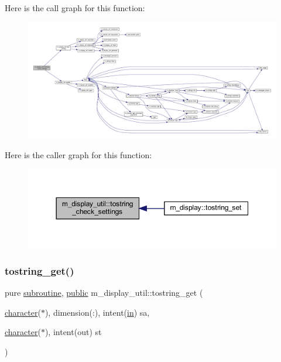 Here is the call graph for this function\+:
\nopagebreak
\begin{figure}[H]
\begin{center}
\leavevmode
\includegraphics[width=350pt]{namespacem__display__util_a76361afb9f9c3952c258f1f8053ec62a_cgraph}
\end{center}
\end{figure}
Here is the caller graph for this function\+:
\nopagebreak
\begin{figure}[H]
\begin{center}
\leavevmode
\includegraphics[width=350pt]{namespacem__display__util_a76361afb9f9c3952c258f1f8053ec62a_icgraph}
\end{center}
\end{figure}
\mbox{\label{namespacem__display__util_a8329f722c059861aa54faa8f7668cc41}} 
\subsubsection{\texorpdfstring{tostring\+\_\+get()}{tostring\_get()}}
{\footnotesize\ttfamily pure \hyperlink{M__stopwatch_83_8txt_acfbcff50169d691ff02d4a123ed70482}{subroutine}, \hyperlink{M__stopwatch_83_8txt_a2f74811300c361e53b430611a7d1769f}{public} m\+\_\+display\+\_\+util\+::tostring\+\_\+get (\begin{DoxyParamCaption}\item[{\hyperlink{option__stopwatch_83_8txt_abd4b21fbbd175834027b5224bfe97e66}{character}($\ast$), dimension(\+:), intent(\hyperlink{M__journal_83_8txt_afce72651d1eed785a2132bee863b2f38}{in})}]{sa,  }\item[{\hyperlink{option__stopwatch_83_8txt_abd4b21fbbd175834027b5224bfe97e66}{character}($\ast$), intent(out)}]{st }\end{DoxyParamCaption})}




